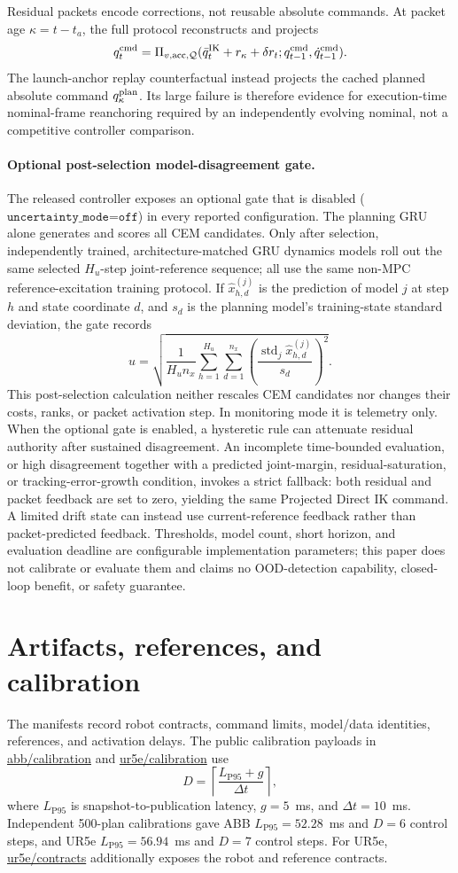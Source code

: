 \documentclass[10pt]{article}
\begin{document}
Residual packets encode corrections, not reusable absolute commands. At packet
age $\kappa=t-t_a$, the full protocol reconstructs and projects
\[
q_t^{\rm cmd}=\Pi_{v,\mathrm{acc},\mathcal Q}(\bar q_t^{\rm IK}+r_\kappa+\delta r_t;
q_{t-1}^{\rm cmd},\dot q_{t-1}^{\rm cmd}).
\]
The launch-anchor replay counterfactual instead projects the cached planned
absolute command $q_\kappa^{\rm plan}$. Its large failure is therefore evidence
for execution-time nominal-frame reanchoring required by an independently
evolving nominal, not a competitive controller comparison.

\paragraph{Optional post-selection model-disagreement gate.}
The released controller exposes an optional gate that is disabled
($\texttt{uncertainty\_mode=off}$) in every reported configuration. The planning
GRU alone generates and scores all CEM candidates. Only after selection,
independently trained, architecture-matched GRU dynamics models roll out the
same selected $H_u$-step joint-reference sequence; all use the same non-MPC
reference-excitation training protocol. If $\hat{x}^{(j)}_{h,d}$ is
the prediction of model $j$ at step $h$ and state coordinate $d$, and $s_d$ is
the planning model's training-state standard deviation, the gate records
\[
 u=\sqrt{\frac{1}{H_u n_x}\sum_{h=1}^{H_u}\sum_{d=1}^{n_x}
 \left(\frac{\operatorname{std}_j\hat{x}^{(j)}_{h,d}}{s_d}\right)^2}.
\]
This post-selection calculation neither rescales CEM candidates nor changes
their costs, ranks, or packet activation step. In monitoring mode it is
telemetry only. When the optional gate is enabled, a hysteretic rule can
attenuate residual authority after sustained disagreement. An incomplete
time-bounded evaluation, or high disagreement together with a predicted
joint-margin, residual-saturation, or tracking-error-growth condition, invokes
a strict fallback: both residual and packet feedback are set to zero, yielding
the same Projected Direct IK command. A limited drift state can instead use
current-reference feedback rather than packet-predicted feedback. Thresholds,
model count, short horizon, and evaluation deadline are configurable
implementation parameters; this paper does not calibrate or evaluate them and
claims no OOD-detection capability, closed-loop benefit, or safety guarantee.

\section{Artifacts, references, and calibration}
The manifests record robot contracts, command limits, model/data identities,
references, and activation delays. The public calibration payloads in
\url{abb/calibration} and \url{ur5e/calibration} use
\[
D=\left\lceil\frac{L_{\mathrm{P95}}+g}{\Delta t}\right\rceil,
\]
where $L_{\mathrm{P95}}$ is snapshot-to-publication latency, $g=5$~ms, and
$\Delta t=10$~ms. Independent 500-plan calibrations gave ABB
$L_{\mathrm{P95}}=52.28$~ms and $D=6$ control steps, and UR5e
$L_{\mathrm{P95}}=56.94$~ms and $D=7$ control steps. For UR5e,
\url{ur5e/contracts} additionally exposes the robot and reference contracts.
\end{document}

